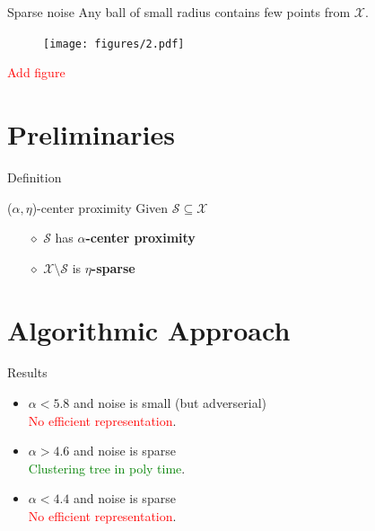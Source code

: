 \documentclass{beamer}
\newcommand{\mc}{\mathcal}
\begin{document}
\begin{frame}{Sparse noise}
    Any ball of small radius contains few points from $\mc X$.
    \begin{figure}
	  \texttt{[image: figures/2.pdf]}
   \end{figure}
    	 
	\textcolor{red}{Add figure}
\end{frame}

\section{Preliminaries}

\begin{frame}{Definition}
	\begin{block}{($\alpha, \eta$)-center proximity}
	Given $\mc S \subseteq \mc X$
	\begin{itemize}
  	\item[$\diamond$] $\mc S$ has {\bf $\alpha$-center proximity}
	\item[$\diamond$]$\mc X \setminus \mc S$ is {\bf $\eta$-sparse}
	\end{itemize}
	\end{block}
\end{frame}

\section{Algorithmic Approach}

\begin{frame}{Results}
  \begin{itemize}
  	\item $\alpha < 5.8$ and noise is small (but adverserial)\\ \textcolor{red}{No efficient representation}. 
  	\pause
  	\item $\alpha > 4.6$ and noise is sparse\\ 
  	\textcolor{green}{Clustering tree in poly time}.
  	\pause
  	\item $\alpha < 4.4$ and noise is sparse\\ 
  	\textcolor{red}{No efficient representation}. 
  \end{itemize}
\end{frame}
\end{document}
